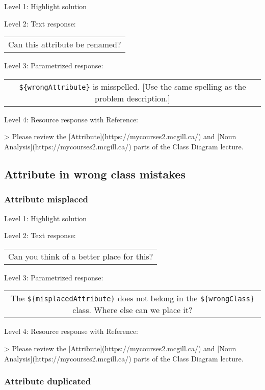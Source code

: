 \noindent Level 1: Highlight solution \medskip

\noindent Level 2: Text response: \medskip

\begin{tabular}{|c}
Can this attribute be renamed?
\end{tabular} \medskip

\noindent Level 3: Parametrized response: \medskip

\begin{tabular}{|c}
\verb|${wrongAttribute}| is misspelled. [Use the same spelling as the problem description.]
\end{tabular} \medskip

\noindent Level 4: Resource response with Reference:

> Please review the [Attribute](https://mycourses2.mcgill.ca/) and [Noun Analysis](https://mycourses2.mcgill.ca/) parts of the Class Diagram lecture.


\subsection{Attribute in wrong class mistakes}

\subsubsection{Attribute misplaced}

\noindent Level 1: Highlight solution \medskip

\noindent Level 2: Text response: \medskip

\begin{tabular}{|c}
Can you think of a better place for this?
\end{tabular} \medskip

\noindent Level 3: Parametrized response: \medskip

\begin{tabular}{|c}
The \verb|${misplacedAttribute}| does not belong in the \verb|${wrongClass}| class. Where else can we place it?
\end{tabular} \medskip

\noindent Level 4: Resource response with Reference:

> Please review the [Attribute](https://mycourses2.mcgill.ca/) and [Noun Analysis](https://mycourses2.mcgill.ca/) parts of the Class Diagram lecture.


\subsubsection{Attribute duplicated}

